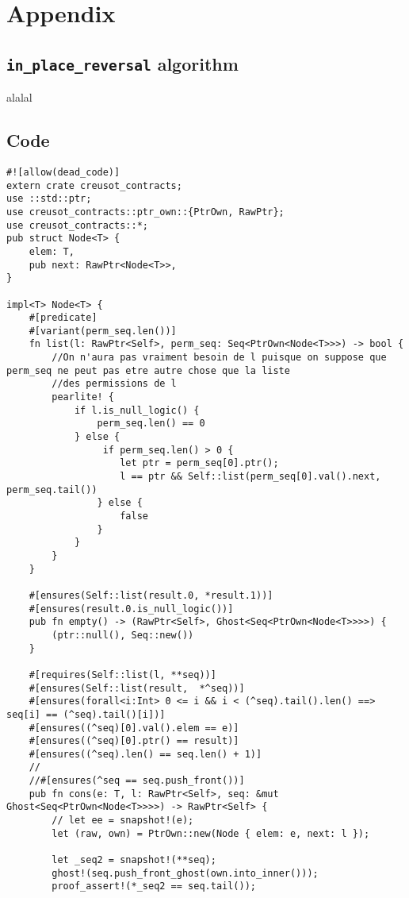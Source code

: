 
\chapter{Appendix}

\hypertarget{reversal}{\section{\texttt{in\_place\_reversal} algorithm}}
alalal
\section{Code}
\begin{verbatim}
#![allow(dead_code)]
extern crate creusot_contracts;
use ::std::ptr;
use creusot_contracts::ptr_own::{PtrOwn, RawPtr};
use creusot_contracts::*;
pub struct Node<T> {
    elem: T,
    pub next: RawPtr<Node<T>>,
}

impl<T> Node<T> {
    #[predicate]
    #[variant(perm_seq.len())]
    fn list(l: RawPtr<Self>, perm_seq: Seq<PtrOwn<Node<T>>>) -> bool {
        //On n'aura pas vraiment besoin de l puisque on suppose que perm_seq ne peut pas etre autre chose que la liste
        //des permissions de l
        pearlite! {
            if l.is_null_logic() {
                perm_seq.len() == 0
            } else {
                 if perm_seq.len() > 0 {
                    let ptr = perm_seq[0].ptr();
                    l == ptr && Self::list(perm_seq[0].val().next, perm_seq.tail())
                } else {
                    false
                }
            }
        }
    }

    #[ensures(Self::list(result.0, *result.1))]
    #[ensures(result.0.is_null_logic())]
    pub fn empty() -> (RawPtr<Self>, Ghost<Seq<PtrOwn<Node<T>>>>) {
        (ptr::null(), Seq::new())
    }

    #[requires(Self::list(l, **seq))]
    #[ensures(Self::list(result,  *^seq))]
    #[ensures(forall<i:Int> 0 <= i && i < (^seq).tail().len() ==> seq[i] == (^seq).tail()[i])]
    #[ensures((^seq)[0].val().elem == e)]
    #[ensures((^seq)[0].ptr() == result)]
    #[ensures((^seq).len() == seq.len() + 1)]
    //
    //#[ensures(^seq == seq.push_front())]
    pub fn cons(e: T, l: RawPtr<Self>, seq: &mut Ghost<Seq<PtrOwn<Node<T>>>>) -> RawPtr<Self> {
        // let ee = snapshot!(e);
        let (raw, own) = PtrOwn::new(Node { elem: e, next: l });

        let _seq2 = snapshot!(**seq);
        ghost!(seq.push_front_ghost(own.into_inner()));
        proof_assert!(*_seq2 == seq.tail());


\end{verbatim}
